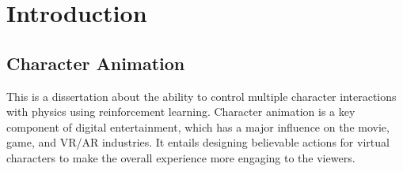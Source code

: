 \documentclass{l4proj}
\begin{document}
\tableofcontents

%
%
%

%
%
%
%
\chapter{Introduction}


\section{Character Animation}
This is a dissertation about the ability to control multiple character interactions with physics using reinforcement learning. Character animation is a key component of digital entertainment, which has a major influence on the movie, game, and VR/AR industries. It entails designing believable actions for virtual characters to make the overall experience more engaging to the viewers.
\end{document}
